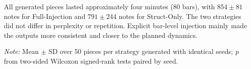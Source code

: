 \documentclass[conference,a4paper]{IEEEtran}
\begin{document}
All generated pieces lasted approximately four minutes (80 bars), with $854 \pm 81$ notes for Full-Injection and $791 \pm 244$ notes for Struct-Only. The two strategies did not differ in perplexity or repetition. Explicit bar-level injection mainly made the outputs more consistent and closer to the planned dynamics.

\begin{table}[htbp]
\centering
\caption{Quantitative Evaluation of Generated Music}
\label{tab:evaluation_results}
\vspace{2pt}
\parbox{\columnwidth}{\small \textit{Note:} Mean $\pm$ SD over 50 pieces per strategy generated with identical seeds; \textit{p} from two-sided Wilcoxon signed-rank tests paired by seed.}
\end{table}
\end{document}
